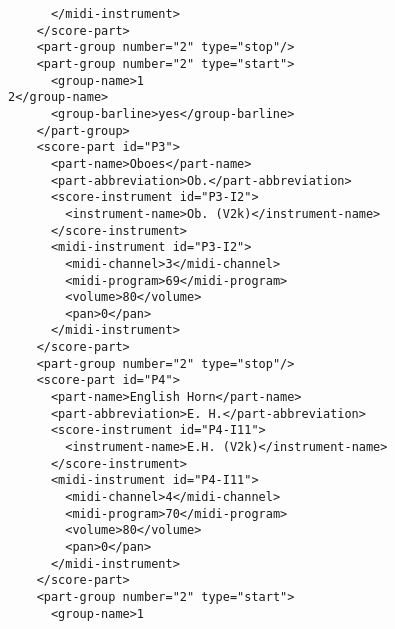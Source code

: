 \documentclass[11pt,english]{article}
\begin{document}
\begin{lstlisting}
      </midi-instrument>
    </score-part>
    <part-group number="2" type="stop"/>
    <part-group number="2" type="start">
      <group-name>1
2</group-name>
      <group-barline>yes</group-barline>
    </part-group>
    <score-part id="P3">
      <part-name>Oboes</part-name>
      <part-abbreviation>Ob.</part-abbreviation>
      <score-instrument id="P3-I2">
        <instrument-name>Ob. (V2k)</instrument-name>
      </score-instrument>
      <midi-instrument id="P3-I2">
        <midi-channel>3</midi-channel>
        <midi-program>69</midi-program>
        <volume>80</volume>
        <pan>0</pan>
      </midi-instrument>
    </score-part>
    <part-group number="2" type="stop"/>
    <score-part id="P4">
      <part-name>English Horn</part-name>
      <part-abbreviation>E. H.</part-abbreviation>
      <score-instrument id="P4-I11">
        <instrument-name>E.H. (V2k)</instrument-name>
      </score-instrument>
      <midi-instrument id="P4-I11">
        <midi-channel>4</midi-channel>
        <midi-program>70</midi-program>
        <volume>80</volume>
        <pan>0</pan>
      </midi-instrument>
    </score-part>
    <part-group number="2" type="start">
      <group-name>1

\end{lstlisting}
\newpage
\end{document}
